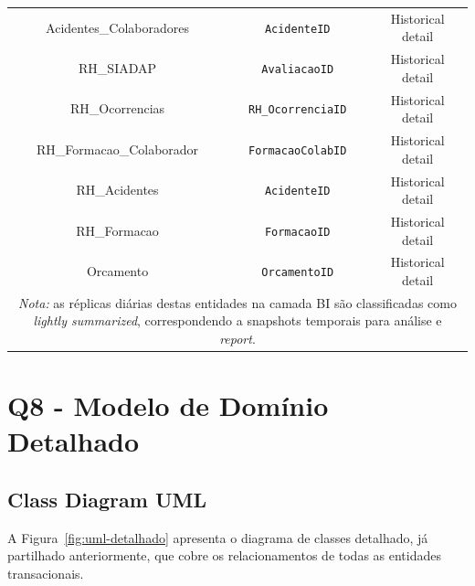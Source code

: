 \documentclass[12pt,a4paper,final]{article}
\begin{document}
\begin{table}[]
\begin{tabular}{@{}|c|c|c|@{}}
            Acidentes\_Colaboradores        & \texttt{AcidenteID}         & Historical detail\\
            RH\_SIADAP                       & \texttt{AvaliacaoID}        & Historical detail\\
            RH\_Ocorrencias                 & \texttt{RH\_OcorrenciaID}   & Historical detail\\
            RH\_Formacao\_Colaborador       & \texttt{FormacaoColabID}    & Historical detail\\
            RH\_Acidentes                   & \texttt{AcidenteID}          & Historical detail\\
            RH\_Formacao                   & \texttt{FormacaoID}        & Historical detail\\
            Orcamento                       & \texttt{OrcamentoID}    & Historical detail\\
            \midrule
            \multicolumn{3}{p{12cm}}{\textit{Nota:} as réplicas diárias destas entidades na
            camada BI são classificadas como \emph{lightly summarized}, correspondendo a
            snapshots temporais para análise e \textit{report}.}\\
            \bottomrule
        \end{tabular}
    \end{table}
    \newpage
    \section*{Q8 - Modelo de Domínio Detalhado}

    \subsection*{Class Diagram UML}\label{subsec:class-diagram-uml}
    A Figura~\ref{fig:uml-detalhado} apresenta o diagrama de classes
    detalhado, já partilhado anteriormente, que cobre os relacionamentos de todas
    as entidades transacionais.
\end{document}
